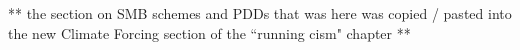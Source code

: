 
** the section on SMB schemes and PDDs that was here was copied / pasted into the new Climate Forcing section of the ``running cism" chapter **

%
%
%
%
%
%
%
